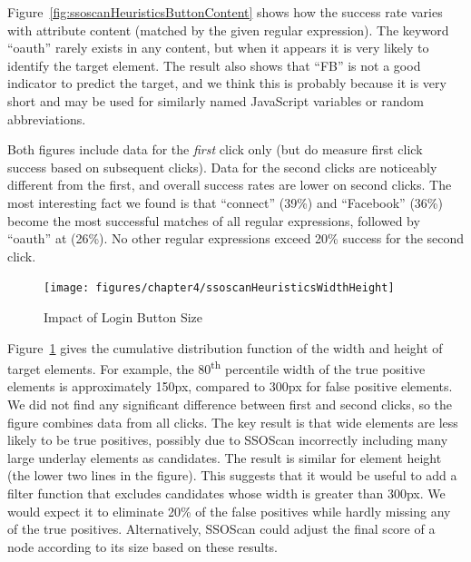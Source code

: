 Figure~\ref{fig:ssoscanHeuristicsButtonContent} shows how the success rate varies with attribute content (matched by the given regular expression).  The keyword ``oauth'' rarely exists in any content, but when it appears it is very likely to identify the target element.  The result also shows that ``FB'' is not a good indicator to predict the target, and we think this is probably because it is very short and may be used for similarly named JavaScript variables or random abbreviations.

Both figures include data for the \emph{first} click only (but do measure first click success based on subsequent clicks).  Data for the second clicks are noticeably different from the first, and overall success rates are lower on second clicks.  The most interesting fact we found is that ``connect'' (39\%) and ``Facebook'' (36\%) become the most successful matches of all regular expressions, followed by ``oauth'' at (26\%).  No other regular expressions exceed 20\% success for the second click.  


\begin{figure}[htb]
\centering
\texttt{[image: figures/chapter4/ssoscanHeuristicsWidthHeight]}
\caption{Impact of Login Button Size}
\label{fig:ssoscanHeuristicsWidthHeight}
\end{figure}

 Figure~\ref{fig:ssoscanHeuristicsWidthHeight} gives the cumulative distribution function of the width and height of target elements.  For example, the 80\textsuperscript{th} percentile width of the true positive elements is approximately 150px, compared to 300px for false positive elements.  We did not find any significant difference between first and second clicks, so the figure combines data from all clicks.  The key result is that wide elements are less likely to be true positives, possibly due to SSOScan incorrectly including many large underlay elements as candidates.  The result is similar for element height (the lower two lines in the figure).  This suggests that it would be useful to add a filter function that excludes candidates whose width is greater than 300px.  We would expect it to eliminate 20\% of the false positives while hardly missing any of the true positives.  Alternatively, SSOScan could adjust the final score of a node according to its size based on these results.

